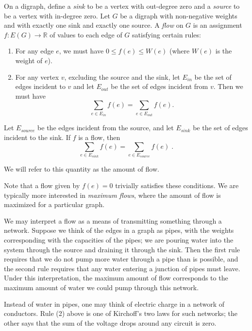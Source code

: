 \documentclass[12pt]{article}
\begin{document}
On a digraph, define a \emph{sink} to be a vertex with
out-degree zero and a \emph{source} to be a vertex with
in-degree zero.
Let $G$ be a digraph with non-negative weights and with exactly
one sink and exactly one source.
A \emph{flow} on $G$ is an assignment
$f : E(G) \rightarrow \mathbb{R}$
of values to each edge of $G$ satisfying certain rules:

\begin{enumerate}
\item For any edge $e$, we must have
$0 \leq f(e) \leq W(e)$ (where $W(e)$ is the weight of $e$).
\item For any vertex $v$, excluding the source and the sink, let $E_{in}$ be
the set of edges incident to $v$ and let $E_{out}$ be the set of edges
incident from $v$.
Then we must have   
$$\sum_{e \in E_{in}} f(e) = \sum_{e \in E_{out}} f(e) .$$
\end{enumerate}

Let $E_{source}$ be the edges incident from the source, and let $E_{sink}$ be
the set of edges incident to the sink.
If $f$ is a flow, then
$$\sum_{e \in E_{sink}} f(e) = \sum_{e \in E_{source}} f(e)\;.$$

We will refer to this quantity as the amount of flow.

Note that a flow given by $f(e) = 0$ trivially satisfies these conditions.
We are typically more interested in \emph{maximum flows}, where the amount
of flow is maximized for a particular graph.

We may interpret a flow as a means of transmitting something through
a network.
Suppose we think of the edges in a graph as pipes, with the weights
corresponding with the capacities of the pipes; we are pouring water
into the system through the source and draining it through the sink.
Then the first rule requires that we do not pump more water through
a pipe than is possible, and the second rule requires that any water
entering a junction of pipes must leave. 
Under this interpretation, the maximum amount of flow corresponds to
the maximum amount of water we could pump through this network.

Instead of water in pipes, one may think of electric charge in a network of conductors.
Rule (2) above is one of Kirchoff's two laws for such networks; the other
says that the sum of the voltage drops around any circuit is zero.
\end{document}
